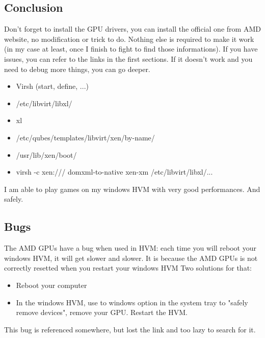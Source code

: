 \documentclass[12pt]{article}
\begin{document}
\subsection{Conclusion}
Don't forget to install the GPU drivers, you can install the official one from AMD website, no modification or trick to do.
Nothing else is required to make it work (in my case at least, once I finish to fight to find those informations).
If you have issues, you can refer to the links in the first sections.
If it doesn't work and you need to debug more things, you can go deeper.
\begin{itemize}
\item Virsh (start, define, ...)
\item /etc/libvirt/libxl/
\item xl
\item /etc/qubes/templates/libvirt/xen/by-name/
\item /usr/lib/xen/boot/
\item virsh -c xen:/// domxml-to-native xen-xm /etc/libvirt/libxl/...
\end{itemize}

I am able to play games on my windows HVM with very good performances.
And safely.

\subsection{Bugs}
The AMD GPUs have a bug when used in HVM:
each time you will reboot your windows HVM, it will get slower and slower.
It is because the AMD GPUs is not correctly resetted when you restart your windows HVM
Two solutions for that:
\begin{itemize}
\item Reboot your computer
\item In the windows HVM, use to windows option in the system tray to "safely remove devices", remove your GPU. Restart the HVM.
\end{itemize}

This bug is referenced somewhere, but lost the link and too lazy to search for it.
\end{document}
